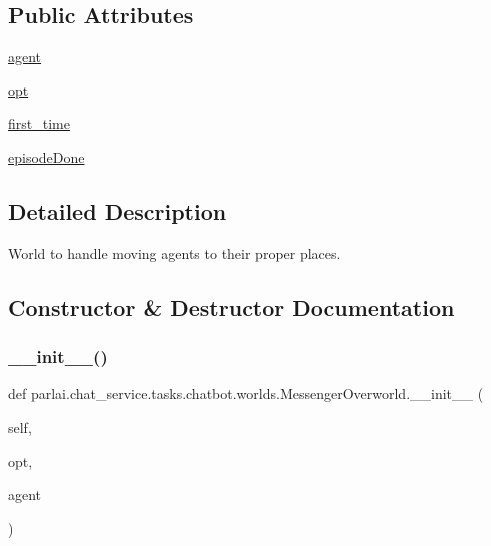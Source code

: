 \subsection*{Public Attributes}
\begin{DoxyCompactItemize}
\item 
\hyperlink{classparlai_1_1chat__service_1_1tasks_1_1chatbot_1_1worlds_1_1MessengerOverworld_a2c9b1c253f93506640d00dcd975548d9}{agent}
\item 
\hyperlink{classparlai_1_1chat__service_1_1tasks_1_1chatbot_1_1worlds_1_1MessengerOverworld_afc4bf12a3b71a4fad010c33c66d20f19}{opt}
\item 
\hyperlink{classparlai_1_1chat__service_1_1tasks_1_1chatbot_1_1worlds_1_1MessengerOverworld_a0c0c4647495d5b6c8df4aeb10a3524a9}{first\+\_\+time}
\item 
\hyperlink{classparlai_1_1chat__service_1_1tasks_1_1chatbot_1_1worlds_1_1MessengerOverworld_a7f4fa1b277a998f3e9f4847f4d12b0d3}{episode\+Done}
\end{DoxyCompactItemize}


\subsection{Detailed Description}
\begin{DoxyVerb}World to handle moving agents to their proper places.
\end{DoxyVerb}
 

\subsection{Constructor \& Destructor Documentation}
\mbox{\label{classparlai_1_1chat__service_1_1tasks_1_1chatbot_1_1worlds_1_1MessengerOverworld_ab8e8320ea06a0972b48eb5f068a55b25}} 
\subsubsection{\texorpdfstring{\+\_\+\+\_\+init\+\_\+\+\_\+()}{\_\_init\_\_()}}
{\footnotesize\ttfamily def parlai.\+chat\+\_\+service.\+tasks.\+chatbot.\+worlds.\+Messenger\+Overworld.\+\_\+\+\_\+init\+\_\+\+\_\+ (\begin{DoxyParamCaption}\item[{}]{self,  }\item[{}]{opt,  }\item[{}]{agent }\end{DoxyParamCaption})}



